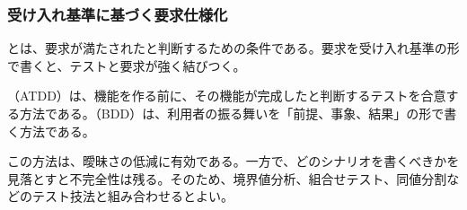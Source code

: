 \subsubsection{受け入れ基準に基づく要求仕様化}

とは、要求が満たされたと判断するための条件である。要求を受け入れ基準の形で書くと、テストと要求が強く結びつく。

（ATDD）は、機能を作る前に、その機能が完成したと判断するテストを合意する方法である。（BDD）は、利用者の振る舞いを「前提、事象、結果」の形で書く方法である。


この方法は、曖昧さの低減に有効である。一方で、どのシナリオを書くべきかを見落とすと不完全性は残る。そのため、境界値分析、組合せテスト、同値分割などのテスト技法と組み合わせるとよい。
